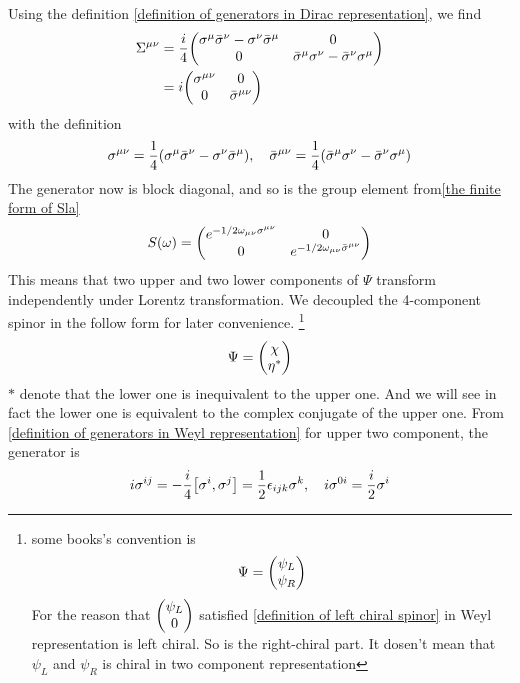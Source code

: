 Using the definition \eqref{definition of generators in Dirac representation}, we find
\begin{align}\label{definition of generators in Weyl representation}
\Si^{\m\n} 
&= \frac{i}{4}
\mqty(
\s^{\m}\bar{\s}^{\n}-\s^{\n}\bar{\s}^{\m}& 
0\\
0&                             
\bar{\s}^{\m}\s^{\n}-\bar{\s}^{\n}\s^{\m}) \notag\\
& = i \mqty(
\s^{\m\n}&
0\\
0&
\bar{\s}^{\m\n})
\end{align}
with the definition
\begin{equation}
\sigma^{\mu\nu} =\frac{1}{4}(\sigma^{\mu}\bar{\sigma}^{\nu}-\sigma^{\nu}\bar{\sigma}^{\mu}),\quad
\bar{\sigma}^{\mu\nu}
=\frac{1}{4}(\bar{\sigma}^{\mu}\sigma^{\nu}-\bar{\sigma}^{\nu}\sigma^{\mu})
\end{equation}
The generator now is block diagonal, and so is the group element from\eqref{the finite form of Sla}
\begin{equation}\label{group element for weyl representation}
S(\w) = \mqty(
e^{-1/2\w_{\m\n}\s^{\m\n}} &
0                           \\
0                           &
e^{-1/2\w_{\m\n}\bar{\s}^{\m\n}})
\end{equation}
This means that two upper and two lower components of $\Psi$  transform independently under Lorentz transformation. We decoupled the 4-component spinor in the follow form for later convenience.
\footnote{
	some books's convention is
	\begin{equation}
	 \Psi = \mqty(\admat{\psi_L \\ \psi_R})
	\end{equation}
	For the reason that $\mqty(\admat{\psi_L \\ 0})$ satisfied \eqref{definition of left chiral spinor} in Weyl representation is left chiral. So is the right-chiral part. It dosen't mean that $\psi_L$ and $\psi_R$ is chiral in two component representation
	}
\begin{equation}
\Psi = \mqty(\admat{\chi \\ \h^*})
\end{equation}
$*$ denote that the lower one is inequivalent to the upper one. And we will see in fact the lower one is equivalent to the complex conjugate of the upper one. 
From \eqref{definition of generators in Weyl representation} for upper two component, the generator is 
\begin{equation}\label{the generator for  two component}
i\s^{ij} = -\frac{i}{4}\comm{\s^{i}}{\s^{j}} = \half\e_{ijk} \s^k ,\quad
i\s^{0i} = \frac{i}{2}\s^{i}
\end{equation}
